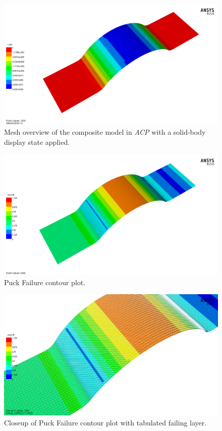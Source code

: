 \begin{figure}[htp]
\centering
\includegraphics[width=1\textwidth]{./figures/fea/fea-acp-z-def}
\caption{Mesh overview of the composite model in \textit{ACP} with a solid-body display state applied.}
\label{fig:fea-acp-z-def}
\end{figure}


\begin{figure}[htp]
\centering
\includegraphics[width=1\textwidth]{./figures/fea/fea-acp-pfailure-notext}
\caption{Puck Failure contour plot.}
\label{fig:fea-acp-pfailure-notext}
\end{figure}

\begin{figure}[htp]
\centering
\includegraphics[width=1\textwidth]{./figures/fea/fea-acp-pfailure-layer-closeup}
\caption{Closeup of Puck Failure contour plot with tabulated failing layer.}
\label{fig:fea-acp-pfailure-layer-closeup}
\end{figure}

